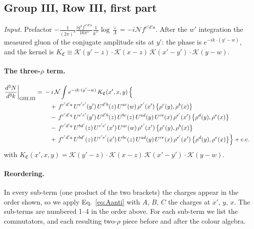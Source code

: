 \documentclass[10pt]{article}
\numberwithin{equation}{section}
\newcommand{\KK}{\mathcal K}
\newcommand{\NN}{\mathcal N}
\begin{document}
\subsection{Group III, Row III, first part}\label{sec:GIII.III}
\emph{Input.} Prefactor $-\frac{1}{(2\pi)^3}\frac{ig^4f^{c'd'a}}{16\pi^5}\frac1{k^+}\log\frac\vee\Lambda=-i\NN f^{c'd'a}$. After the $w'$ integration the measured gluon of the conjugate amplitude sits at $y'$: the phase is $e^{-ik\cdot(y'-w)}$, and the kernel is $K_{\mathfrak C}\equiv\KK(y'-z)\cdot\KK(x-z)\,\KK(x'-y')\cdot\KK(y-w)$.
\paragraph{The three-$\rho$ term.}
\begin{align}
\frac{d^3N}{d^3k}\bigg|_{\rm GIII.III}={}&-i\,\NN\int e^{-ik\cdot(y'-w)}\,K_{\mathfrak C}(x',x,y)\,\Big\{\notag\\
&\quad +\,f^{c'd'a}\,U^{e'c'}(y')\,U^{d'b}(z)\,U^{ac}(w)\,\rho^{e'}(x')\,\big\{\rho^{c}(y),\rho^{b}(x)\big\}\notag\\
&\quad -\,f^{c'd'a}\,U^{e'c'}(y')\,U^{d'b}(z)\,U^{bc}(z)\,U^{ad}(y)\,U^{ce}(x)\,\rho^{e'}(x')\,\big\{\rho^{d}(y),\rho^{e}(x)\big\}\notag\\
&\quad -\,f^{c'd'a}\,U^{bd'}(z)\,U^{c'e'}(x')\,U^{ac}(w)\,\rho^{e'}(x')\,\big\{\rho^{c}(y),\rho^{b}(x)\big\}\notag\\
&\quad +\,f^{c'd'a}\,U^{bd'}(z)\,U^{c'e'}(x')\,U^{bc}(z)\,U^{ad}(y)\,U^{ce}(x)\,\rho^{e'}(x')\,\big\{\rho^{d}(y),\rho^{e}(x)\big\}\Big\}+{\rm c.c.}\label{eq:in-GIII.III}
\end{align}
with $K_{\mathfrak C}(x',x,y)=\KK(y'-z)\cdot\KK(x-z)\,\KK(x'-y')\cdot\KK(y-w)$.
\paragraph{Reordering.} In every sub-term (one product of the two brackets) the charges appear in the order shown, so we apply Eq.~\eqref{eq:Aanti} with $A$, $B$, $C$ the charges at $x'$, $y$, $x$. The sub-terms are numbered 1--4 in the order above. For each sub-term we list the commutators, and each resulting two-$\rho$ piece before and after the colour algebra.
\end{document}
